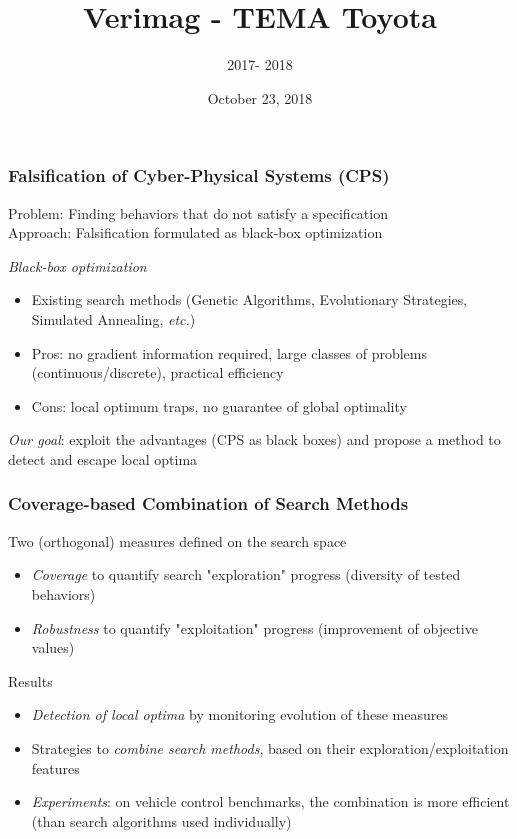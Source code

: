 %







\title{Verimag - TEMA Toyota}
\subtitle{ 2017- 2018}
\date{October 23, 2018}
\author{}
\institute{}



\maketitle

    


\begin{frame}
\frametitle{Falsification of Cyber-Physical Systems (CPS) }
\alert{Problem}: Finding behaviors that do not satisfy a specification\\ 
\alert{Approach}: Falsification formulated as black-box optimization  

{\em Black-box optimization}
\begin{itemize} 
\item Existing search methods (Genetic Algorithms, Evolutionary Strategies, Simulated Annealing, {\em etc.})
\item Pros: no gradient information required, large classes of problems (continuous/discrete), practical efficiency
\item Cons: local optimum traps, no guarantee of global optimality
\end{itemize}
{\em Our goal}: exploit the advantages (CPS as black boxes) and propose a method to detect and escape local optima 
\end{frame}


\begin{frame}
\frametitle{Coverage-based Combination of Search Methods}
\fontsize{13pt}{13pt}\selectfont
Two (orthogonal) measures defined on the search space
\begin{itemize}
\item {\em Coverage} to quantify search "exploration" progress (diversity of tested behaviors)  
\item {\em Robustness} to quantify "exploitation" progress (improvement of objective values)
\end{itemize} 
\alert{Results}
\begin{itemize}
\item {\em Detection of local optima} by monitoring evolution of these measures
\item Strategies to {\em combine search methods}, based on their exploration/exploitation features
\item {\em Experiments}:  on vehicle control benchmarks, the combination is more efficient (than search algorithms used individually)
\end{itemize}

\end{frame}


